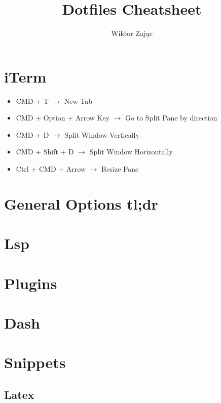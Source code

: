 \documentclass[12pt, a4paper]{article}
\title{Dotfiles Cheatsheet}
\author{Wiktor Zając}
\begin{document}
\maketitle
\vspace{5mm}
\tableofcontents

\section{iTerm}

\begin{itemize}
    \item CMD + T $\rightarrow$ New Tab
    \item CMD + Option + Arrow Key $\rightarrow$ Go to Split Pane by direction
    \item CMD + D $\rightarrow$ Split Window Vertically 
    \item CMD + Shift + D $\rightarrow$ Split Window Horizontally 
    \item Ctrl + CMD + Arrow $\rightarrow$ Resize Pane
\end{itemize}

\section{General Options tl;dr}

\section{Lsp}

\section{Plugins}

\section{Dash}

\section{Snippets}

\subsection{Latex}
\end{document}

